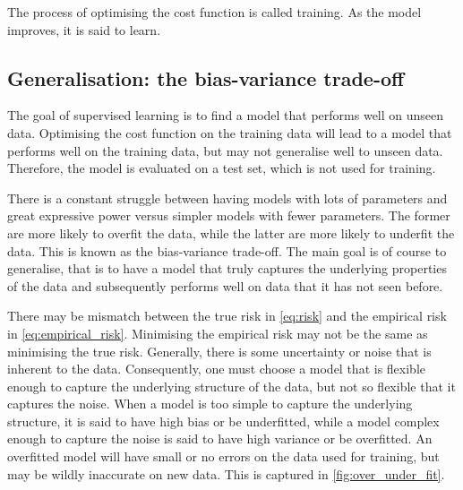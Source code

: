 The process of optimising the cost function is called training.
As the model improves, it is said to learn.

\subsection{Generalisation: the bias-variance trade-off}
The goal of supervised learning is to find a model that performs well on unseen data.
Optimising the cost function on the training data will lead to a model that performs well on the training data, but may not generalise well to unseen data.
Therefore, the model is evaluated on a test set, which is not used for training.

There is a constant struggle between having models with lots of parameters and great expressive power versus simpler models with fewer parameters.
The former are more likely to overfit the data, while the latter are more likely to underfit the data.
This is known as the bias-variance trade-off.
The main goal is of course to generalise, that is to have a model that truly captures the underlying properties of the data and subsequently performs well on data that it has not seen before.

There may be mismatch between the true risk in \cref{eq:risk} and the empirical risk in \cref{eq:empirical_risk}.
Minimising the empirical risk may not be the same as minimising the true risk.
Generally, there is some uncertainty or noise that is inherent to the data.
Consequently, one must choose a model that is flexible enough to capture the underlying structure of the data, but not so flexible that it captures the noise.
When a model is too simple to capture the underlying structure, it is said to have high bias or be underfitted, while a model complex enough to capture the noise is said to have high variance or be overfitted.
An overfitted model will have small or no errors on the data used for training, but may be wildly inaccurate on new data.
This is captured in \cref{fig:over_under_fit}.

